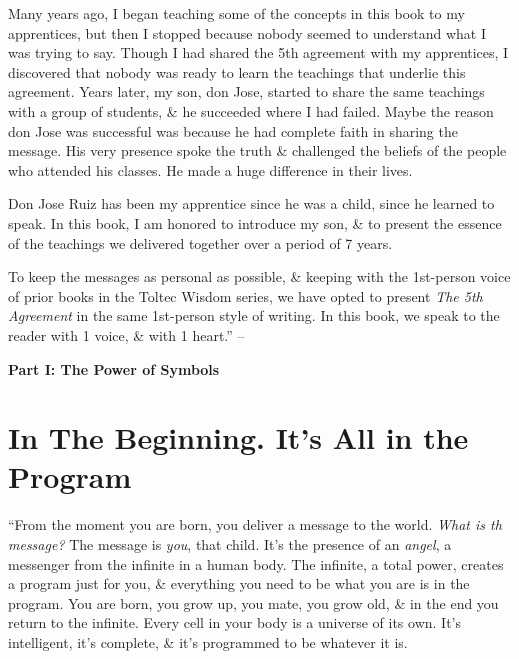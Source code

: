 \documentclass{article}
\numberwithin{equation}{section}
\begin{document}
Many years ago, I began teaching some of the concepts in this book to my apprentices, but then I stopped because nobody seemed to understand what I was trying to say. Though I had shared the 5th agreement with my apprentices, I discovered that nobody was ready to learn the teachings that underlie this agreement. Years later, my son, don Jose, started to share the same teachings with a group of students, \& he succeeded where I had failed. Maybe the reason don Jose was successful was because he had complete faith in sharing the message. His very presence spoke the truth \& challenged the beliefs of the people who attended his classes. He made a huge difference in their lives.

Don Jose Ruiz has been my apprentice since he was a child, since he learned to speak. In this book, I am honored to introduce my son, \& to present the essence of the teachings we delivered together over a period of 7 years.

To keep the messages as personal as possible, \& keeping with the 1st-person voice of prior books in the Toltec Wisdom series, we have opted to present \textit{The 5th Agreement} in the same 1st-person style of writing. In this book, we speak to the reader with 1 voice, \& with 1 heart.'' -- \cite[pp. 14--15]{Ruiz_Ruiz2011}


\begin{center}\Large\bf
	Part I: The Power of Symbols
\end{center}


\section{In The Beginning. It's All in the Program}
``From the moment you are born, you deliver a message to the world. \textit{What is th message?} The message is \textit{you}, that child. It's the presence of an \textit{angel}, a messenger from the infinite in a human body. The infinite, a total power, creates a program just for you, \& everything you need to be what you are is in the program. You are born, you grow up, you mate, you grow old, \& in the end you return to the infinite. Every cell in your body is a universe of its own. It's intelligent, it's complete, \& it's programmed to be whatever it is.
\end{document}
